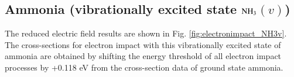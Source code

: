 \subsection{Ammonia (vibrationally excited state $\rm NH_3$$(v)$)}

The reduced electric field results are shown in Fig. \ref{fig:electronimpact_NH3v}. The cross-sections for electron impact with this vibrationally excited state of ammonia are obtained by shifting the energy threshold of all electron impact processes by +0.118 eV from the cross-section data of ground state ammonia.
%
\begin{figure}[!htbp]

\end{figure}
